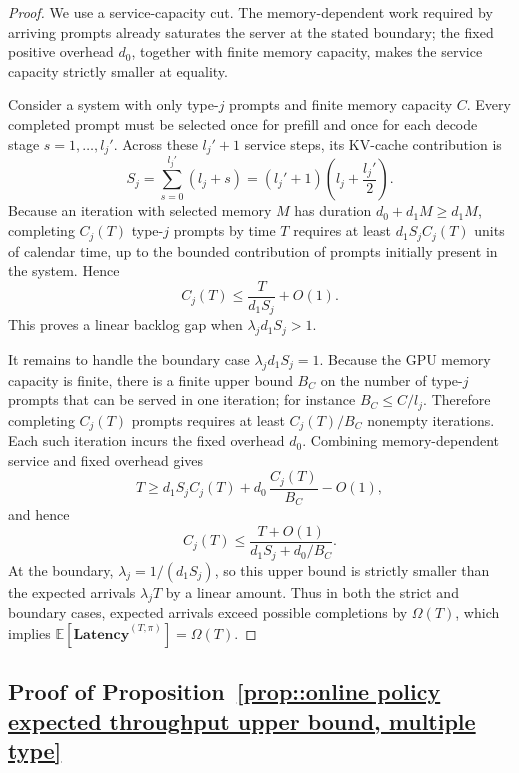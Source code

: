 \begin{proof}
We use a service-capacity cut. The memory-dependent work required by arriving prompts already saturates the server at the stated boundary; the fixed positive overhead \(d_0\), together with finite memory capacity, makes the service capacity strictly smaller at equality.

Consider a system with only type-\(j\) prompts and finite memory capacity \(C\). Every completed prompt must be selected once for prefill and once for each decode stage \(s=1,\ldots,l_j'\). Across these \(l_j'+1\) service steps, its KV-cache contribution is
\[
    S_j=\sum_{s=0}^{l_j'}(l_j+s)=(l_j'+1)\left(l_j+\frac{l_j'}{2}\right).
\]
Because an iteration with selected memory \(M\) has duration \(d_0+d_1M\ge d_1M\), completing \(C_j(T)\) type-\(j\) prompts by time \(T\) requires at least \(d_1S_j C_j(T)\) units of calendar time, up to the bounded contribution of prompts initially present in the system. Hence
\[
    C_j(T)\le \frac{T}{d_1S_j}+O(1).
\]
This proves a linear backlog gap when \(\lambda_jd_1S_j>1\).

It remains to handle the boundary case \(\lambda_jd_1S_j=1\). Because the GPU memory capacity is finite, there is a finite upper bound \(B_C\) on the number of type-\(j\) prompts that can be served in one iteration; for instance \(B_C\le C/l_j\). Therefore completing \(C_j(T)\) prompts requires at least \(C_j(T)/B_C\) nonempty iterations. Each such iteration incurs the fixed overhead \(d_0\). Combining memory-dependent service and fixed overhead gives
\[
    T \ge d_1S_j C_j(T)+d_0\,\frac{C_j(T)}{B_C}-O(1),
\]
and hence
\[
    C_j(T)\le \frac{T+O(1)}{d_1S_j+d_0/B_C}.
\]
At the boundary, \(\lambda_j=1/(d_1S_j)\), so this upper bound is strictly smaller than the expected arrivals \(\lambda_jT\) by a linear amount. Thus in both the strict and boundary cases, expected arrivals exceed possible completions by \(\Omega(T)\), which implies \(\mathbb{E}[\textbf{Latency}^{(T,\pi)}]=\Omega(T)\).
\end{proof}

\subsection{Proof of Proposition~\ref{prop::online policy expected throughput upper bound, multiple type}}
\label{appendix:proof_throughput_upper_bound}

